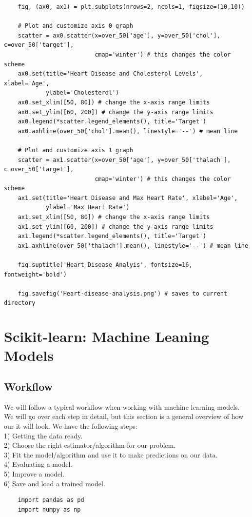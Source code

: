 \documentclass[11pt, a4paper]{article}
\begin{document}
\begin{spacing}{1.1}
\begin{lstlisting}
	fig, (ax0, ax1) = plt.subplots(nrows=2, ncols=1, figsize=(10,10))
	
	# Plot and customize axis 0 graph
	scatter = ax0.scatter(x=over_50['age'], y=over_50['chol'], c=over_50['target'], 
	                      cmap='winter') # this changes the color scheme
	ax0.set(title='Heart Disease and Cholesterol Levels', xlabel='Age', 
	        ylabel='Cholesterol')
	ax0.set_xlim([50, 80]) # change the x-axis range limits
	ax0.set_ylim([60, 200]) # change the y-axis range limits
	ax0.legend(*scatter.legend_elements(), title='Target')      
	ax0.axhline(over_50['chol'].mean(), linestyle='--') # mean line
	
	# Plot and customize axis 1 graph
	scatter = ax1.scatter(x=over_50['age'], y=over_50['thalach'], c=over_50['target'],
	                      cmap='winter') # this changes the color scheme
	ax1.set(title='Heart Disease and Max Heart Rate', xlabel='Age', 
	        ylabel='Max Heart Rate')
	ax1.set_xlim([50, 80]) # change the x-axis range limits
	ax1.set_ylim([60, 200]) # change the y-axis range limits
	ax1.legend(*scatter.legend_elements(), title='Target')      
	ax1.axhline(over_50['thalach'].mean(), linestyle='--') # mean line 
	
	fig.suptitle('Heart Disease Analyis', fontsize=16, fontweight='bold')
	
	fig.savefig('Heart-disease-analysis.png') # saves to current directory \end{lstlisting} \newpage

	\section{Scikit-learn: Machine Leaning Models}
	\subsection{Workflow}
	We will follow a typical workflow when working with machine learning models. We will go over each step in detail, but this section is a general overview of how our it will look. We have the following steps: \\
	\hspace*{2mm} 1) Getting the data ready. \\
	\hspace*{2mm} 2) Choose the right estimator/algorithm for our problem. \\
	\hspace*{2mm} 3) Fit the model/algorithm and use it to make predictions on our data. \\
	\hspace*{2mm} 4) Evaluating a model. \\
	\hspace*{2mm} 5) Improve a model. \\
	\hspace*{2mm} 6) Save and load a trained model.	
	\begin{lstlisting}
	import pandas as pd
	import numpy as np
	

\end{lstlisting}
\end{spacing}
\end{document}
